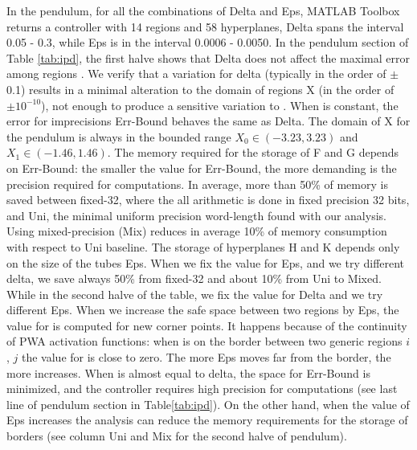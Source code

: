 In the pendulum, for all the combinations of Delta and Eps, MATLAB Toolbox returns a controller with 14 regions and 58 hyperplanes, Delta spans the interval 0.05 - 0.3, while Eps is in the interval 0.0006 - 0.0050. In the pendulum section of Table \ref{tab:ipd}, the first halve shows that Delta does not affect the maximal error among regions \maxUij. We verify that a variation for delta (typically in the order of $\pm$ 0.1) results in a minimal alteration to the domain of regions X (in the order of $\pm 10^{-10}$), not enough to produce a sensitive variation to \maxUij. When \maxUij is constant, the error for imprecisions Err-Bound behaves the same as Delta. The domain of X for the pendulum is always in the bounded range $X_{0} \in (-3.23, 3.23)$ and $X_{1}\in (-1.46, 1.46)$.
The memory required for the storage of F and G depends on Err-Bound: the smaller the value for Err-Bound, the more demanding is the precision required for computations. In average, more than 50\% of memory is saved between fixed-32, where the all arithmetic is done in fixed precision 32 bits, and Uni, the minimal uniform precision word-length found with our analysis. Using mixed-precision (Mix) reduces in average 10\% of memory consumption with respect to Uni baseline. The storage of hyperplanes H and K depends only on the size of the tubes Eps. When we fix the value for Eps, and we try different delta, we save always 50\% from fixed-32 and about 10\% from Uni to Mixed. While in the second halve of the table, we fix the value for Delta and we try different Eps. When we increase the safe space between two regions by Eps, the value for \maxUij is computed for new corner points. It happens because of the continuity of PWA activation functions: when \statevarmath is on the border between two generic regions $i$, $j$ the value for \maxUij is close to zero. The more Eps moves \statevarmath far from the border, the more \maxUij increases. When \maxUij is almost equal to delta, the space for Err-Bound is minimized, and the controller requires high precision for computations (see last line of pendulum section in Table\ref{tab:ipd}). On the other hand, when the value of Eps increases the analysis can reduce the memory requirements for the storage of borders (see column Uni and Mix for the second halve of pendulum).

